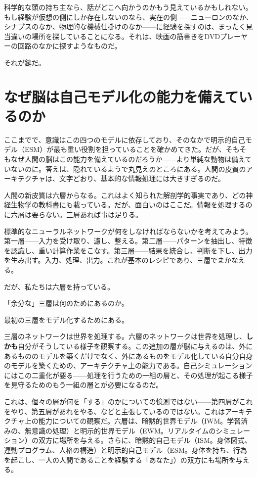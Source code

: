 \documentclass[11pt, twoside, openright]{book}
\begin{document}
科学的な頭の持ち主なら、話がどこへ向かうのかもう見えているかもしれない。もし経験が仮想の側にしか存在しないのなら、実在の側------ニューロンのなか、シナプスのなか、物理的な機械仕掛けのなか------に経験を探すのは、まったく見当違いの場所を探していることになる。それは、映画の筋書きをDVDプレーヤーの回路のなかに探すようなものだ。

それが鍵だ。

\section*{なぜ脳は自己モデル化の能力を備えているのか}

ここまでで、意識はこの四つのモデルに依存しており、そのなかで明示的自己モデル（ESM）が最も重い役割を担っていることを確かめてきた。だが、そもそもなぜ人間の脳はこの能力を備えているのだろうか------より単純な動物は備えていないのに。答えは、隠れているようで丸見えのところにある。人間の皮質のアーキテクチャは、文字どおり、基本的な情報処理には大きすぎるのだ。

人間の新皮質は六層からなる。これはよく知られた解剖学的事実であり、どの神経生物学の教科書にも載っている。だが、面白いのはここだ。情報を処理するのに六層は要らない。三層あれば事は足りる。

標準的なニューラルネットワークが何をしなければならないかを考えてみよう。第一層------入力を受け取り、濾し、整える。第二層------パターンを抽出し、特徴を認識し、重い計算作業をこなす。第三層------結果を統合し、判断を下し、出力を生み出す。入力、処理、出力。これが基本のレシピであり、三層でまかなえる。

だが、私たちは六層を持っている。

「余分な」三層は何のためにあるのか。

最初の三層をモデル化するためにある。

三層のネットワークは世界を処理する。六層のネットワークは世界を処理し、\textbf{しかも}自分がそうしている様子を観察する。この追加の層が脳に与えるのは、外にあるもののモデルを築くだけでなく、外にあるものをモデル化している自分自身のモデルを築くための、アーキテクチャ上の能力である。自己シミュレーションにはこの二重化が要る------処理を行うための一組の層と、その処理が起こる様子を見守るためのもう一組の層とが必要になるのだ。

これは、個々の層が何を「する」のかについての憶測ではない------第四層がこれをやり、第五層があれをやる、などと主張しているのではない。これはアーキテクチャ上の能力についての観察だ。六層は、暗黙的世界モデル（IWM。学習済みの、無意識の処理）と明示的世界モデル（EWM。リアルタイムのシミュレーション）の双方に場所を与える。さらに、暗黙的自己モデル（ISM。身体図式、運動プログラム、人格の構造）と明示的自己モデル（ESM。身体を持ち、行為を起こし、一人の人間であることを経験する「あなた」）の双方にも場所を与える。
\end{document}
